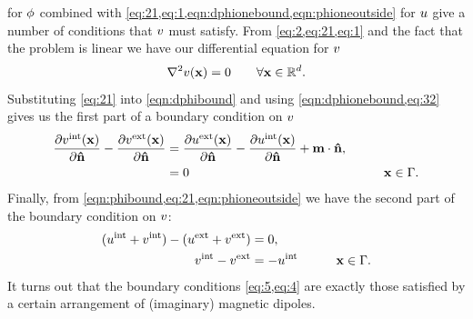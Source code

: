  for $\phi$ combined with \cref{eq:21,eq:1,eqn:dphionebound,eqn:phioneoutside} for $u$ give a number of conditions that $v$ must satisfy.
From \cref{eq:2,eq:21,eq:1} and the fact that the problem is linear we have our differential equation for $v$
\begin{equation}
  \label{eq:8}
  \nabla^2 v(\mathbf{x}) = 0 \qquad \forall \mathbf{x} \in {\mathbb{R}^d}.
\end{equation}
Substituting \cref{eq:21} into \cref{eqn:dphibound} and using \cref{eqn:dphionebound,eq:32} gives us the first part of a boundary condition on $v$
\begin{equation}
  \begin{aligned}
    \frac{\partial v^{\mathrm{int}}(\mathbf{x})}{\partial \mathbf{\hat{n}}} - \frac{\partial v^{\mathrm{ext}}(\mathbf{x})}{\partial \mathbf{\hat{n}}} &=
    \frac{\partial u^{\mathrm{ext}}(\mathbf{x})}{\partial \mathbf{\hat{n}}} - \frac{\partial u^{\mathrm{int}}(\mathbf{x})}{\partial \mathbf{\hat{n}}} 
    + \mathbf{m} \cdot \mathbf{\hat{n}}, & \\
     &= 0 &\qquad \mathbf{x} \in {\Gamma}.
    \label{eq:5}
  \end{aligned}
\end{equation}
Finally, from \cref{eqn:phibound,eq:21,eqn:phioneoutside} we have the second part of the boundary condition on $v$:
\begin{equation}
  \begin{aligned}
    (u^{\mathrm{int}} + v^{\mathrm{int}}) - (u^{\mathrm{ext}} + v^{\mathrm{ext}}) &= 0, \\
    v^{\mathrm{int}} - v^{\mathrm{ext}} &= - u^{\mathrm{int}} &\qquad \mathbf{x} \in {\Gamma}.
    \label{eq:4}
  \end{aligned}
\end{equation}
It turns out that the boundary conditions \cref{eq:5,eq:4} are exactly those satisfied by a certain arrangement of (imaginary) magnetic dipoles.


